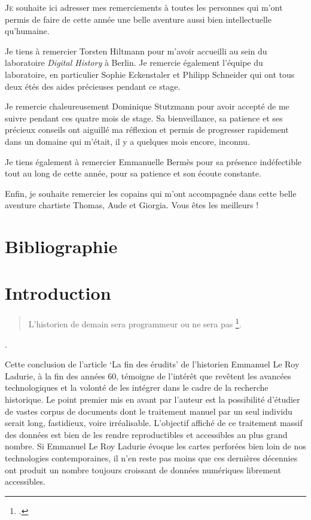 \documentclass[12pt,twoside]{book}
\begin{document}
\lettrine{J}e souhaite ici adresser mes remerciements à toutes les personnes qui m’ont permis de faire de cette année une belle aventure aussi bien intellectuelle qu’humaine. 

Je tiens à remercier Torsten Hiltmann pour m’avoir accueilli au sein du laboratoire \textit{Digital History }à Berlin. Je remercie également l’équipe du laboratoire, en particulier Sophie Eckenstaler et Philipp Schneider qui ont tous deux étés des aides précieuses pendant ce stage.

Je remercie chaleureusement Dominique Stutzmann pour avoir accepté de me suivre pendant ces quatre mois de stage. Sa bienveillance, sa patience et ses précieux conseils ont aiguillé ma réflexion et permis de progresser rapidement dans un domaine qui m’était, il y a quelques mois encore, inconnu.

Je tiens également à remercier Emmanuelle Bermès pour sa présence indéfectible tout au long de cette année, pour sa patience et son écoute constante.

Enfin, je souhaite remercier les copains qui m’ont accompagnée dans cette belle aventure chartiste Thomas, Aude et Giorgia. Vous êtes les meilleurs !




\chapter{Bibliographie}
\printbibliography

\chapter{Introduction}


\begin{quote}
L’historien de demain sera programmeur ou ne sera pas \footcite{le_roy_ladurie_fin_1968}.
\end{quote}.


Cette conclusion de l’article ‘La fin des érudits’ de l’historien Emmanuel Le Roy Ladurie, à la fin des années 60, témoigne de l’intérêt que revêtent les avancées technologiques et la volonté de les intégrer dans le cadre de la recherche historique. Le point premier mis en avant par l’auteur est la possibilité d’étudier de vastes corpus de documents dont le traitement manuel par un seul individu serait long, fastidieux, voire irréalisable. L’objectif affiché de ce traitement massif des données est bien de les rendre reproductibles et accessibles au plus grand nombre. Si Emmanuel Le Roy Ladurie évoque les cartes perforées bien loin de nos technologies contemporaines, il n’en reste pas moins que ces dernières décennies ont produit un nombre toujours croissant de données numériques librement accessibles. \\
\end{document}
